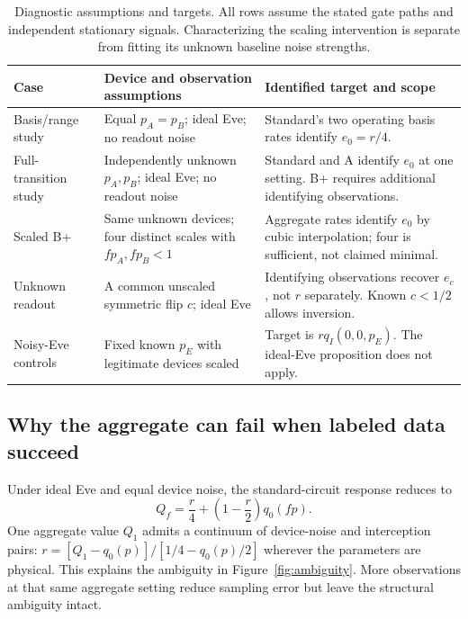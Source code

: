 \documentclass[manuscript,screen,review,anonymous]{acmart}
\begin{document}
\begin{table}[!htbp]
\centering
\small\setlength{\tabcolsep}{4pt}
\caption{Diagnostic assumptions and targets. All rows assume the stated gate paths
and independent stationary signals. Characterizing the scaling intervention is
separate from fitting its unknown baseline noise strengths.}
\label{tab:assumptions}
\begin{tabular}{@{}>{\raggedright\arraybackslash}p{.19\linewidth}>{\raggedright\arraybackslash}p{.34\linewidth}>{\raggedright\arraybackslash}p{.42\linewidth}@{}}
\toprule
Case & Device and observation assumptions & Identified target and scope \\
\midrule
Basis/range study & Equal $p_A=p_B$; ideal Eve; no readout noise &
Standard's two operating basis rates identify $e_0=r/4$. \\
Full-transition study & Independently unknown $p_A,p_B$; ideal Eve; no readout noise &
Standard and A identify $e_0$ at one setting. B+ requires additional identifying observations. \\
Scaled B+ & Same unknown devices; four distinct scales with $fp_A,fp_B<1$ &
Aggregate rates identify $e_0$ by cubic interpolation; four is sufficient, not claimed minimal. \\
Unknown readout & A common unscaled symmetric flip $c$; ideal Eve &
Identifying observations recover $e_c$, not $r$ separately. Known $c<1/2$ allows inversion. \\
Noisy-Eve controls & Fixed known $p_E$ with legitimate devices scaled &
Target is $r q_I(0,0,p_E)$. The ideal-Eve proposition does not apply. \\
\bottomrule
\end{tabular}
\end{table}

\subsection{Why the aggregate can fail when labeled data succeed}
Under ideal Eve and equal device noise, the standard-circuit response reduces to
\begin{equation}
 Q_f=\frac r4+\left(1-\frac r2\right)q_0(fp).
 \label{eq:attackequal}
\end{equation}
One aggregate value $Q_1$ admits a continuum of device-noise and interception
pairs: $r=[Q_1-q_0(p)]/[1/4-q_0(p)/2]$ wherever the parameters are physical.
This explains the ambiguity in Figure~\ref{fig:ambiguity}. More observations
at that same aggregate setting reduce sampling error but leave the structural
ambiguity intact.
\end{document}
